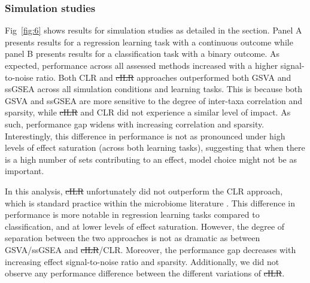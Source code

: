 \documentclass[10pt,letterpaper]{article}
\providecommand{\DIFaddtex}[1]{{\protect\color{blue}\uwave{#1}}} %
\providecommand{\DIFdeltex}[1]{{\protect\color{red}\sout{#1}}}                      %
\providecommand{\DIFaddbegin}{} %
\providecommand{\DIFaddend}{} %
\providecommand{\DIFdelbegin}{} %
\providecommand{\DIFdelend}{} %
\providecommand{\DIFadd}[1]{\texorpdfstring{\DIFaddtex{#1}}{#1}} %
\providecommand{\DIFdel}[1]{\texorpdfstring{\DIFdeltex{#1}}{}} %
\newcommand{\DIFscaledelfig}{0.5}
\newlength{\DIFdelgraphicswidth} %
\newlength{\DIFdelgraphicsheight} %
\newcommand{\DIFaddincludegraphics}[2][]{{\color{blue}\fbox{\DIFOincludegraphics[#1]{#2}}}} %
\newcommand{\DIFdelincludegraphics}[2][]{%
\sbox{\DIFdelgraphicsbox}{\DIFOincludegraphics[#1]{#2}}%
\settoboxwidth{\DIFdelgraphicswidth}{\DIFdelgraphicsbox} %
\settoboxtotalheight{\DIFdelgraphicsheight}{\DIFdelgraphicsbox} %
\scalebox{\DIFscaledelfig}{%
\parbox[b]{\DIFdelgraphicswidth}{\usebox{\DIFdelgraphicsbox}\\[-\baselineskip] \rule{\DIFdelgraphicswidth}{0em}}\llap{\resizebox{\DIFdelgraphicswidth}{\DIFdelgraphicsheight}{%
\setlength{\unitlength}{\DIFdelgraphicswidth}%
\begin{picture}(1,1)%
\thicklines\linethickness{2pt} %
{\color[rgb]{1,0,0}\put(0,0){\framebox(1,1){}}}%
{\color[rgb]{1,0,0}\put(0,0){\line( 1,1){1}}}%
{\color[rgb]{1,0,0}\put(0,1){\line(1,-1){1}}}%
\end{picture}%
}\hspace*{3pt}}} %
} %
\DeclareRobustCommand{\DIFaddbegin}{\DIFOaddbegin \let\includegraphics\DIFaddincludegraphics} %
\DeclareRobustCommand{\DIFaddend}{\DIFOaddend \let\includegraphics\DIFOincludegraphics} %
\DeclareRobustCommand{\DIFdelbegin}{\DIFOdelbegin \let\includegraphics\DIFdelincludegraphics} %
\DeclareRobustCommand{\DIFdelend}{\DIFOaddend \let\includegraphics\DIFOincludegraphics} %
\begin{document}
\subsubsection*{Simulation studies}
Fig~\ref{fig:6} shows results for simulation studies as detailed in the  section. Panel A presents results for a regression learning task with a continuous outcome while panel B presents results for a classification task with a binary outcome. As expected, performance across all assessed methods increased with a higher signal-to-noise ratio. Both CLR and \DIFdelbegin \DIFdel{cILR }\DIFdelend \DIFaddbegin \DIFadd{CBEA }\DIFaddend approaches outperformed both GSVA and ssGSEA across all simulation conditions and learning tasks. This is because both GSVA and ssGSEA are more sensitive to the degree of inter-taxa correlation and sparsity, while \DIFdelbegin \DIFdel{cILR }\DIFdelend \DIFaddbegin \DIFadd{CBEA }\DIFaddend and CLR did not experience a similar level of impact. As such, performance gap widens with increasing correlation and sparsity. Interestingly, this difference in performance is not as pronounced under high levels of effect saturation (across both learning tasks), suggesting that when there is a high number of sets contributing to an effect, model choice might not be as important.   

In this analysis, \DIFdelbegin \DIFdel{cILR }\DIFdelend \DIFaddbegin \DIFadd{CBEA }\DIFaddend unfortunately did not outperform the CLR approach, which is standard practice within the microbiome literature \cite{gloor2017}. This difference in performance is more notable in regression learning tasks compared to classification, and at lower levels of effect saturation. However, the degree of separation between the two approaches is not as dramatic as between GSVA/ssGSEA and \DIFdelbegin \DIFdel{cILR}\DIFdelend \DIFaddbegin \DIFadd{CBEA}\DIFaddend /CLR. Moreover, the performance gap decreases with increasing effect signal-to-noise ratio and sparsity. Additionally, we did not observe any performance difference between the different variations of \DIFdelbegin \DIFdel{cILR}\DIFdelend \DIFaddbegin \DIFadd{CBEA}\DIFaddend . 
\end{document}
